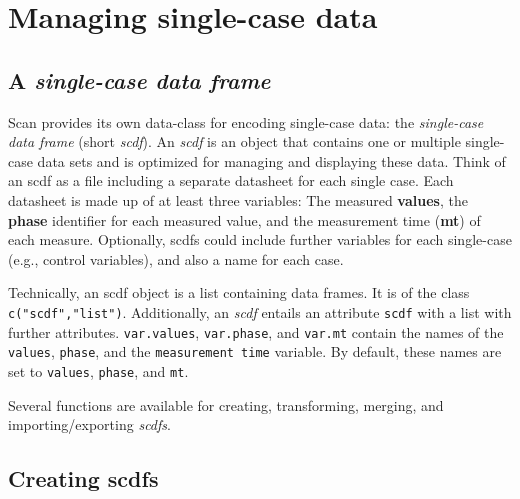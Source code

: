\documentclass[
  letterpaper,
  DIV=11,
  numbers=noendperiod]{scrreprt}
\begin{document}
\hypertarget{managing-single-case-data}{%
\chapter{Managing single-case data}\label{managing-single-case-data}}

\hypertarget{a-single-case-data-frame}{%
\section{\texorpdfstring{A \textbf{\emph{single-case data
frame}}}{A single-case data frame}}\label{a-single-case-data-frame}}

Scan provides its own data-class for encoding single-case data: the
\emph{single-case data frame} (short \emph{scdf}). An \emph{scdf} is an
object that contains one or multiple single-case data sets and is
optimized for managing and displaying these data. Think of an scdf as a
file including a separate datasheet for each single case. Each datasheet
is made up of at least three variables: The measured \textbf{values},
the \textbf{phase} identifier for each measured value, and the
measurement time (\textbf{mt}) of each measure. Optionally, scdfs could
include further variables for each single-case (e.g., control
variables), and also a name for each case.

\begin{tcolorbox}[enhanced jigsaw, opacitybacktitle=0.6, breakable, bottomrule=.15mm, coltitle=black, colbacktitle=quarto-callout-note-color!10!white, colframe=quarto-callout-note-color-frame, left=2mm, colback=white, titlerule=0mm, leftrule=.75mm, opacityback=0, toptitle=1mm, title=\textcolor{quarto-callout-note-color}{\faInfo}\hspace{0.5em}{Note}, arc=.35mm, rightrule=.15mm, toprule=.15mm, bottomtitle=1mm]
Technically, an scdf object is a list containing data frames. It is of
the class \texttt{c("scdf","list")}. Additionally, an \emph{scdf}
entails an attribute \texttt{scdf} with a list with further attributes.
\texttt{var.values}, \texttt{var.phase}, and \texttt{var.mt} contain the
names of the \texttt{values}, \texttt{phase}, and the
\texttt{measurement\ time} variable. By default, these names are set to
\texttt{values}, \texttt{phase}, and \texttt{mt}.
\end{tcolorbox}

Several functions are available for creating, transforming, merging, and
importing/exporting \emph{scdfs}.

\hypertarget{sec-scdf}{%
\section{Creating scdfs}\label{sec-scdf}}
\end{document}
